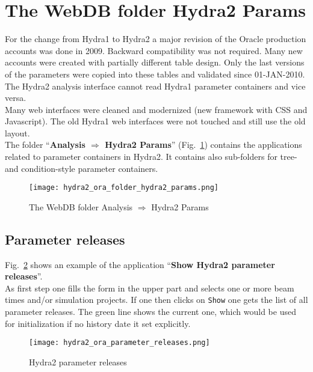 \section[The WebDB folder Hydra2 Params]{The WebDB folder Hydra2 Params} 
\label{sec:oraFolderHydra2Params}

For the change from Hydra1 to Hydra2 a major revision of the Oracle production accounts was done in 2009. Backward 
compatibility was not required. Many new accounts  were created with partially different table design. Only the last 
versions of the parameters were copied into these tables and validated since 01-JAN-2010. The Hydra2 analysis interface cannot 
read Hydra1 parameter containers and vice versa.\\
Many web interfaces were cleaned and modernized (new framework with CSS and Javascript). The old Hydra1 web interfaces 
were not touched and still use the old layout.\\

The folder ``\textbf{Analysis $\Rightarrow$ Hydra2 Params}'' (Fig.~\ref{fig:oraFolderHydra2Params}) contains the applications 
related to parameter containers in Hydra2. It contains also sub-folders for tree- and condition-style parameter containers.

\begin{figure}[\htb]
  \centering
  \texttt{[image: hydra2\_ora\_folder\_hydra2\_params.png]}
  \caption[The WebDB folder Analysis $\Rightarrow$ Hydra2 Params]{The WebDB folder Analysis $\Rightarrow$ Hydra2 Params}
  \label{fig:oraFolderHydra2Params}
\end{figure}


\subsection[Parameter releases]{Parameter releases} \label{sec:oraParameterReleases}

Fig.~\ref{fig:oraParameterReleases} shows an example of the application ``\textbf{Show Hydra2 parameter releases}''.\\
As first step one fills the form in the upper part and selects one or more beam times and/or simulation projects. If one 
then clicks on \verb+Show+ one gets the list of all parameter releases. The green line shows the current one, which would 
be used for initialization if no history date it set explicitly.  

\begin{figure}[\htb]
  \centering
  \texttt{[image: hydra2\_ora\_parameter\_releases.png]}
  \caption[Hydra2 parameter releases]{Hydra2 parameter releases}
  \label{fig:oraParameterReleases}
\end{figure}


